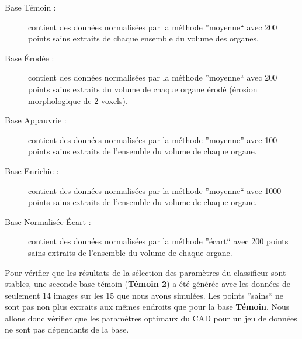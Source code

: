\begin{description}
 \item[Base Témoin : ] contient des données normalisées par la méthode ''moyenne`` avec 200 points sains extraits de chaque ensemble du volume des organes.
 \item[Base Érodée : ] contient des données normalisées par la méthode ''moyenne`` avec 200 points sains extraits du volume de chaque organe érodé (érosion morphologique de 2 voxels).
 \item[Base Appauvrie : ] contient des données normalisées par la méthode ''moyenne'' avec 100 points sains extraits de l'ensemble du volume de chaque organe.
 \item[Base Enrichie : ] contient des données normalisées par la méthode ''moyenne`` avec 1000 points sains extraits de l'ensemble du volume de chaque organe.
 \item[Base Normalisée \'Ecart : ] contient des données normalisées par la méthode ''écart`` avec 200 points sains extraits de l'ensemble du volume de chaque organe.
\end{description}

Pour vérifier que les résultats de la sélection des paramètres du classifieur sont stables, une seconde base témoin (\textbf{Témoin 2}) a été générée avec les données de seulement 14 images sur les 15 que nous avons simulées. Les points ''sains`` ne sont pas non plus extraits aux mêmes endroits que pour la base \textbf{Témoin}. Nous allons donc vérifier que les paramètres optimaux du CAD pour un jeu de données ne sont pas dépendants de la base.

